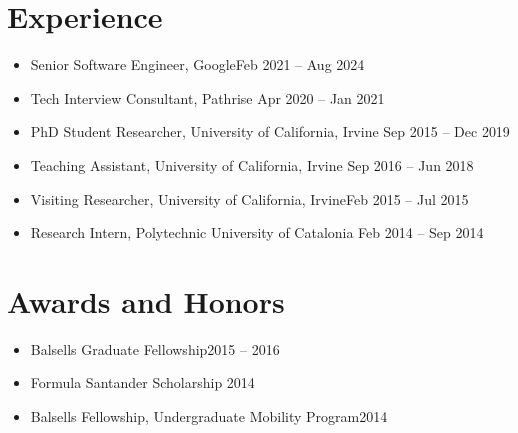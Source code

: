 \documentclass[letterpaper,10pt,oneside]{article}
\begin{document}
\section*{Experience}
\begin{itemize}
	\item Senior Software Engineer, Google\hfill Feb 2021 -- Aug 2024
	\item Tech Interview Consultant, Pathrise \hfill Apr 2020 -- Jan 2021
	\item PhD Student Researcher, University of California, Irvine \hfill Sep 2015 -- Dec 2019
	\item Teaching Assistant, University of California, Irvine \hfill Sep 2016 -- Jun 2018
	\item Visiting Researcher, University of California, Irvine\hfill Feb 2015 -- Jul 2015
  \item Research Intern, Polytechnic University of Catalonia \hfill Feb 2014 -- Sep 2014
\end{itemize}

\section*{Awards and Honors}
\begin{itemize}
	\item Balsells Graduate Fellowship\hfill 2015 -- 2016
	\item Formula Santander Scholarship \hfill 2014
	\item Balsells Fellowship, Undergraduate Mobility Program\hfill 2014
\end{itemize}

\begin{comment}
\section*{Teaching Experience}
\subsection*{Teaching Assistant at University of California, Irvine, USA}
\begin{itemize}
    \item Graph Algorithms \hfill Spring 2017, Spring 2018
    \item Formal Languages and Automata Theory \hfill Winter 2018
    \item Design and Analysis of Algorithms \hfill Fall 2016, Winter 2017
\end{itemize}
\end{comment}
\end{document}

